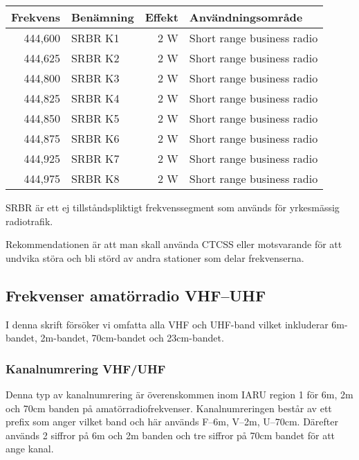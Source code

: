 \begin{longtable}{rlrl}
	\textbf{Frekvens} & \textbf{Benämning} & \textbf{Effekt} & \textbf{Användningsområde} \\ \hline \endhead
	          444,600 & SRBR K1            & 2 W             & Short range business radio \\
	          444,625 & SRBR K2            & 2 W             & Short range business radio \\
	          444,800 & SRBR K3            & 2 W             & Short range business radio \\
	          444,825 & SRBR K4            & 2 W             & Short range business radio \\
	          444,850 & SRBR K5            & 2 W             & Short range business radio \\
	          444,875 & SRBR K6            & 2 W             & Short range business radio \\
	          444,925 & SRBR K7            & 2 W             & Short range business radio \\
	          444,975 & SRBR K8            & 2 W             & Short range business radio
\end{longtable}

SRBR är ett ej tillståndspliktigt frekvenssegment som används för yrkesmässig radiotrafik.

Rekommendationen är att man skall använda CTCSS eller motsvarande för att undvika störa och bli störd av andra stationer som delar frekvenserna.


\subsection{Frekvenser amatörradio VHF--UHF}

I denna skrift försöker vi omfatta alla VHF och UHF-band vilket inkluderar 6m-bandet, 2m-bandet, 70cm-bandet och 23cm-bandet.

\subsubsection{Kanalnumrering VHF/UHF}

Denna typ av kanalnumrering är överenskommen inom IARU region 1 för 6m, 2m och 70cm banden på amatörradiofrekvenser. Kanalnumreringen består av ett prefix som anger vilket band och här används F--6m, V--2m, U--70cm. Därefter används 2 siffror på 6m och 2m banden och tre siffror på 70cm bandet för
att ange kanal.

